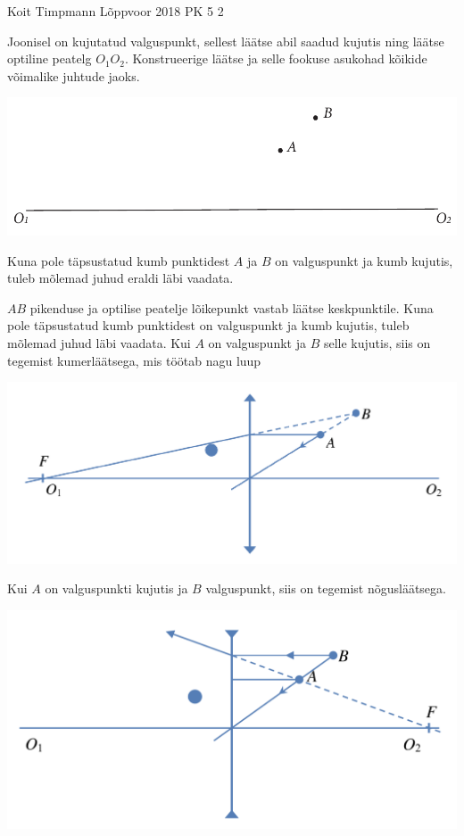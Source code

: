 {Koit Timpmann} %
{Lõppvoor} %
{2018} %
{PK 5} %
{2} %
{
\ifStatement
Joonisel on kujutatud valguspunkt, sellest läätse abil saadud kujutis ning läätse optiline peatelg $O_1O_2$. Konstrueerige läätse ja selle fookuse asukohad kõikide võimalike juhtude jaoks.

\vspace{-0 pt}%
\begin{center}
\includegraphics[width=0.7\linewidth]{laatsefookus.pdf}%
\end{center}
\vspace{50 pt}%
\fi


\ifHint
Kuna pole täpsustatud kumb punktidest $A$ ja $B$ on valguspunkt ja kumb kujutis, tuleb mõlemad juhud eraldi läbi vaadata.
\fi


\ifSolution
$AB$ pikenduse ja optilise peatelje lõikepunkt vastab läätse keskpunktile. Kuna pole täpsustatud kumb punktidest on valguspunkt ja kumb kujutis, tuleb mõlemad juhud läbi vaadata.
Kui $A$ on valguspunkt ja $B$ selle kujutis, siis on tegemist kumerläätsega, mis töötab nagu luup
\vspace{-13 pt}%
\begin{center}
\includegraphics[angle = 270,width=0.7\linewidth]{lahenduslaats1.pdf}%
\end{center}
\vspace{-10 pt}%


Kui $A$ on valguspunkti kujutis ja $B$ valguspunkt, siis on tegemist nõgusläätsega.
\vspace{-20 pt}%
\begin{center}
\includegraphics[angle = 270, width=0.7\linewidth]{lahenduslaats2}%
\end{center}
\vspace{-20 pt}%
\fi
}